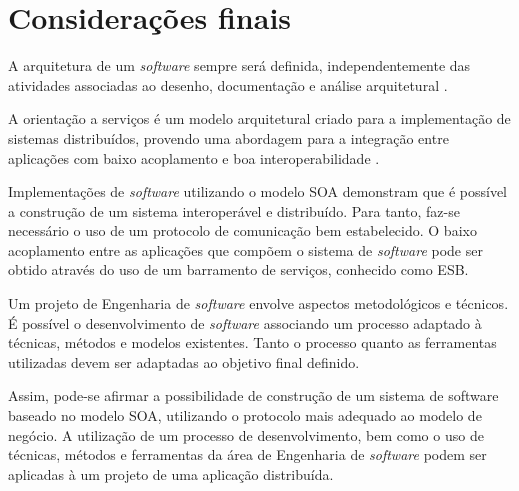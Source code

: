 \section{Considerações finais}

A arquitetura de um \textit{software} sempre será definida, independentemente das atividades associadas ao desenho, documentação e análise arquitetural \cite{bass_software_archi_practice_2003}.

A orientação a serviços é um modelo arquitetural criado para a implementação de sistemas distribuídos, provendo uma abordagem para a integração entre aplicações com baixo acoplamento e boa interoperabilidade \cite{linthicum_soainrealworld_2007}.

Implementações de \textit{software} utilizando o modelo SOA demonstram que é possível a construção de um sistema interoperável e distribuído. Para tanto, faz-se necessário o uso de um protocolo de comunicação bem estabelecido. O baixo acoplamento entre as aplicações que compõem o sistema de \textit{software} pode ser obtido através do uso de um barramento de serviços, conhecido como ESB.

Um projeto de Engenharia de \textit{software} envolve aspectos metodológicos e técnicos. É possível o desenvolvimento de \textit{software} associando um processo adaptado à técnicas, métodos e modelos existentes. Tanto o processo quanto as ferramentas utilizadas devem ser adaptadas ao objetivo final definido.

Assim, pode-se afirmar a possibilidade de construção de um sistema de software baseado no modelo SOA, utilizando o protocolo mais adequado ao modelo de negócio. A utilização de um processo de desenvolvimento, bem como o uso de técnicas, métodos e ferramentas da área de Engenharia de \textit{software} podem ser aplicadas à um projeto de uma aplicação distribuída.